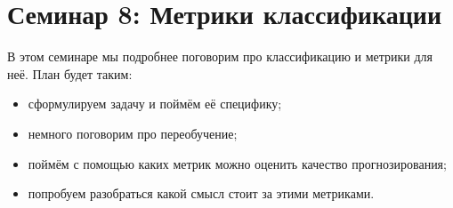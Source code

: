 \documentclass[12pt, a4paper, oneside]{article}
\theoremstyle{plain} %
\theoremstyle{definition}
\begin{document}

\toggletrue{lecture}

\section*{Семинар 8:  Метрики классификации}

В этом семинаре мы подробнее поговорим про классификацию и метрики для неё. План будет таким: 

\begin{itemize}
	\item сформулируем задачу и поймём её специфику;
	\item немного поговорим про переобучение;
	\item поймём с помощью каких метрик можно оценить качество прогнозирования;
	\item попробуем разобраться какой смысл стоит за этими метриками.
\end{itemize}
\end{document}
